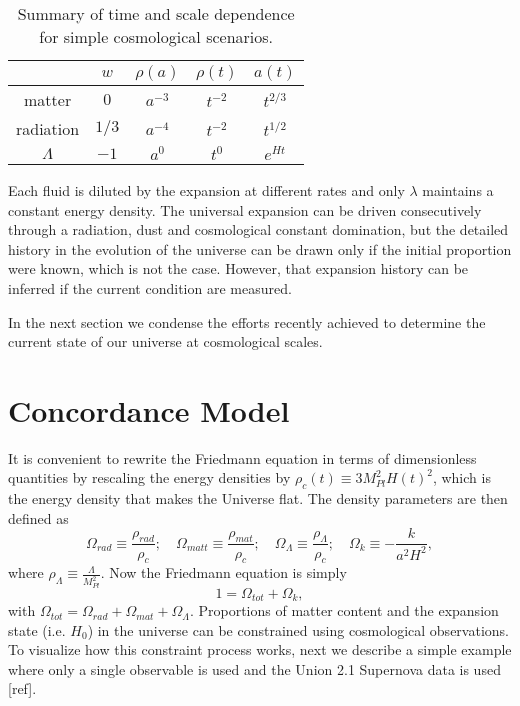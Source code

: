 \documentclass[12pt,letterpaper,twoside]{book}
\begin{document}
\begin{table}[htdp]
    \begin{center}
        \begin{tabular}{|c|c|c|c|c|}
            \hline
                      &   $ w $   & $\rho(a)$ & $\rho(t)$ &  $a(t)$    \\
            \hline
            matter    &   $ 0 $   & $a^{-3}$  &  $t^{-2}$ &  $t^{2/3}$ \\
            radiation &   $1/3$   & $a^{-4}$  &  $t^{-2}$ &  $t^{1/2}$ \\
            $\Lambda$ &   $-1 $   &  $a^0$    &  $ t^0$   &  $e^{Ht}$  \\
            \hline
        \end{tabular}
    \end{center}
    \caption{Summary of time and scale dependence for simple cosmological
        scenarios.}
    \label{tab:time_scale_dependence}
\end{table}


Each fluid is diluted by the expansion at different rates and only $\lambda$
maintains a constant energy density. The universal expansion can be driven
consecutively through a radiation, dust and cosmological constant domination,
but the detailed history in the evolution of the universe can be drawn only if
the initial proportion were known, which is not the case. However, that
expansion history can be inferred if the current condition are measured.

In the next section we condense the efforts recently achieved to determine the
current state of our universe at cosmological scales.

\section{Concordance Model}
\label{sec:concordance_model}

It is convenient to rewrite the Friedmann equation in terms of dimensionless
quantities by rescaling the energy densities by $\rho_c(t) \equiv 3
M_{Pl}^2H(t)^{2}$, which is the energy density that makes the Universe flat.
The density parameters are then defined as
%
\begin{equation}
    \Omega_{rad}\equiv \frac{\rho_{rad}}{\rho_c};
    \quad \Omega_{matt}\equiv \frac{\rho_{mat}}{\rho_c};
    \quad \Omega_\Lambda\equiv \frac{\rho_\Lambda}{\rho_c};
    \quad \Omega_k\equiv -\frac{k}{a^2H^2},
\end{equation}
where $\rho_\Lambda\equiv \frac{\Lambda}{M_{Pl}^2}$. Now the Friedmann
equation is simply
\begin{equation}
\boxed{1=\Omega_{tot} +\Omega_k,}
\end{equation}
with $\Omega_{tot}=\Omega_{rad}+\Omega_{mat}+\Omega_\Lambda$.
Proportions of matter content and the expansion state (i.e. $H_0$) in the
universe can be constrained using cosmological observations.
%
To visualize how this constraint process works, next we describe a simple
example where only a single observable is used and the Union 2.1 Supernova data
is used [ref].
\end{document}
